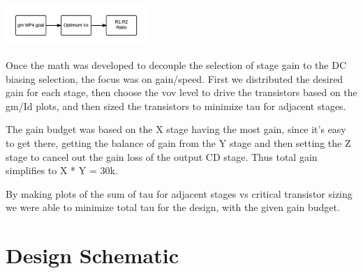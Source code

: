 \documentclass[12pt,a4paper]{article}
\begin{document}
{\centering
	\includegraphics[width=0.4\textwidth]{flowchart_r1_r2.png}\par
}

Once the math was developed to decouple the selection of stage gain to the DC biasing selection, the focus was on gain/speed. 
First we distributed the desired gain for each stage, then choose the vov level to drive the transistors based on the gm/Id plots, 
and then sized the transistors to minimize tau for adjacent stages.\par

The gain budget was based on the X stage having the most gain, since it's easy to get there, getting the balance of gain from the Y stage and then setting the Z stage to cancel out the gain loss of the output CD stage. 
Thus total gain simplifies to X * Y = 30k. \par

By making plots of the sum of tau for adjacent stages vs critical transistor sizing we were able to minimize total tau for the design, with the given gain budget.\par


\pagebreak



\section{Design Schematic}
\end{document}

